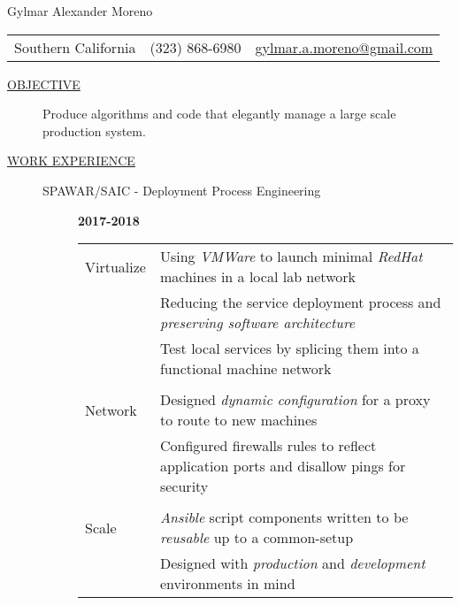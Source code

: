 \documentclass[12pt]{article}
\begin{document}
    \begin{center}
        {\LARGE Gylmar Alexander Moreno}
	\\
        \begin{tabular}{l|l|l}
            Southern California & (323) 868-6980 &
            \href{mailto:gylmar.a.moreno@gmail.com}{gylmar.a.moreno@gmail.com}
        \end{tabular}
    \end{center}

    \begin{description}
        \item[\underline{OBJECTIVE}] Produce algorithms and code that elegantly manage a large scale production system.
            \iffalse Produce algorithms and code that elegantly manage a large scale production system that\fi
        \item[\underline{WORK EXPERIENCE}] \hfill
            \begin{description}
                \item[SPAWAR/SAIC - Deployment Process Engineering] \hfill \textbf{2017-2018}\\
                    \begin{tabular}{l|l}
			Virtualize & Using \textit{VMWare} to launch minimal \textit{RedHat} machines in a local lab network\\
				   & Reducing the service deployment process and \textit{preserving software architecture}\\
				   & Test local services by splicing them into a functional machine network\\
				    \\[-1.7mm]
			Network	   & Designed \textit{dynamic configuration} for a proxy to route to new machines\\
				   & Configured firewalls rules to reflect application ports and disallow pings for security\\
				    \\[-1.7mm]
			Scale	   & \textit{Ansible} script components written to be \textit{reusable} up to a common-setup\\
				   & Designed with \textit{production} and \textit{development} environments in mind\\
                    \end{tabular}


\end{description}
\end{description}
\end{document}
